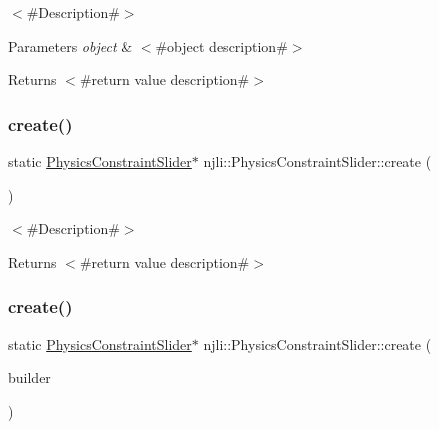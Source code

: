 $<$\#\+Description\#$>$


\begin{DoxyParams}{Parameters}
{\em object} & $<$\#object description\#$>$\\
\hline
\end{DoxyParams}
\begin{DoxyReturn}{Returns}
$<$\#return value description\#$>$ 
\end{DoxyReturn}
\mbox{\label{classnjli_1_1_physics_constraint_slider_a020eb232400507347e4e7fe41e4ae572}} 
\subsubsection{\texorpdfstring{create()}{create()}\hspace{0.1cm}{\footnotesize\ttfamily [1/2]}}
{\footnotesize\ttfamily static \mbox{\hyperlink{classnjli_1_1_physics_constraint_slider}{Physics\+Constraint\+Slider}}$\ast$ njli\+::\+Physics\+Constraint\+Slider\+::create (\begin{DoxyParamCaption}{ }\end{DoxyParamCaption})\hspace{0.3cm}{\ttfamily [static]}}

$<$\#\+Description\#$>$

\begin{DoxyReturn}{Returns}
$<$\#return value description\#$>$ 
\end{DoxyReturn}
\mbox{\label{classnjli_1_1_physics_constraint_slider_a154d2e4acbf2c4a568ed6f95bb5897e9}} 
\subsubsection{\texorpdfstring{create()}{create()}\hspace{0.1cm}{\footnotesize\ttfamily [2/2]}}
{\footnotesize\ttfamily static \mbox{\hyperlink{classnjli_1_1_physics_constraint_slider}{Physics\+Constraint\+Slider}}$\ast$ njli\+::\+Physics\+Constraint\+Slider\+::create (\begin{DoxyParamCaption}\item[{const \mbox{\hyperlink{classnjli_1_1_physics_constraint_slider_builder}{Physics\+Constraint\+Slider\+Builder}} \&}]{builder }\end{DoxyParamCaption})\hspace{0.3cm}{\ttfamily [static]}}


